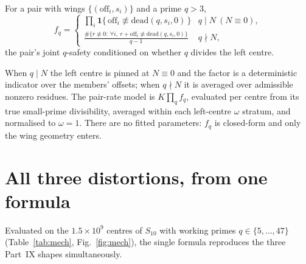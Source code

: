 \documentclass[11pt]{article}
\begin{document}
\begin{definition}
For a pair with wings $\{(\mathrm{off}_i,s_i)\}$ and a prime $q>3$,
\[
 f_q=\begin{cases}
  \displaystyle\prod_i \mathbf 1\{\,\mathrm{off}_i\not\equiv\mathrm{dead}(q,s_i,0)\,\}
   & q\mid N\ (N\equiv0),\\[6pt]
  \displaystyle\frac{\#\{r\not\equiv0:\ \forall i,\ r+\mathrm{off}_i\not\equiv
    \mathrm{dead}(q,s_i,0)\}}{q-1} & q\nmid N,
 \end{cases}
\]
the pair's joint $q$-safety conditioned on whether $q$ divides the left centre.
\end{definition}

When $q\mid N$ the left centre is pinned at $N\equiv0$ and the factor is a
deterministic indicator over the members' offsets; when $q\nmid N$ it is averaged
over admissible nonzero residues. The pair-rate model is $K\prod_{q} f_q$,
evaluated per centre from its true small-prime divisibility, averaged within each
left-centre $\omega$ stratum, and normalised to $\omega=1$. There are no fitted
parameters: $f_q$ is closed-form and only the wing geometry enters.

\section{All three distortions, from one formula}

Evaluated on the $1.5\times10^{9}$ centres of $S_{10}$ with working primes
$q\in\{5,\dots,47\}$ (Table~\ref{tab:mech}, Fig.~\ref{fig:mech}), the single
formula reproduces the three Part~IX shapes simultaneously.
\end{document}
